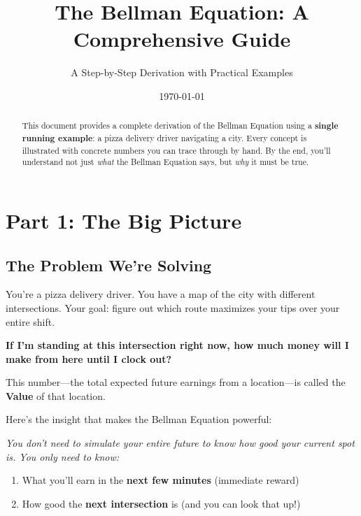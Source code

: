\documentclass[journal, onecolumn]{IEEEtran}
\title{\textcolor{Garnet}{\textbf{The Bellman Equation: A Comprehensive Guide}}}
\author{A Step-by-Step Derivation with Practical Examples}
\date{\today}
\newcommand{\vocab}[1]{\textbf{\textcolor{Garnet}{#1}}}
\begin{document}
\maketitle

\begin{abstract}
This document provides a complete derivation of the Bellman Equation using a \textbf{single running example}: a pizza delivery driver navigating a city. Every concept is illustrated with concrete numbers you can trace through by hand. By the end, you'll understand not just \textit{what} the Bellman Equation says, but \textit{why} it must be true.
\end{abstract}

\section{Part 1: The Big Picture}

\subsection{The Problem We're Solving}

You're a pizza delivery driver. You have a map of the city with different intersections. Your goal: figure out which route maximizes your tips over your entire shift.

\begin{tcolorbox}[memorybox={The Core Question}]
\textbf{If I'm standing at this intersection right now, how much money will I make from here until I clock out?}

This number---the total expected future earnings from a location---is called the \vocab{Value} of that location.
\end{tcolorbox}

Here's the insight that makes the Bellman Equation powerful:

\textit{You don't need to simulate your entire future to know how good your current spot is. You only need to know:}
\begin{enumerate}
    \item What you'll earn in the \textbf{next few minutes} (immediate reward)
    \item How good the \textbf{next intersection} is (and you can look that up!)
\end{enumerate}
\end{document}
